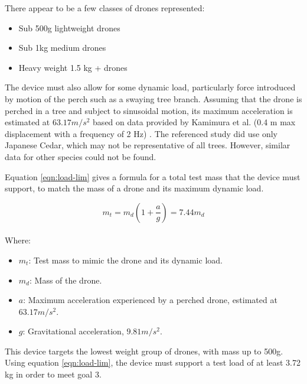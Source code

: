 \begin{minipage}{\linewidth}
There appear to be a few classes of drones represented:
\begin{itemize}
    \item Sub 500g lightweight drones
    \item Sub 1kg medium drones
    \item Heavy weight 1.5 kg + drones
\end{itemize}
\end{minipage}
\vspace{\baselineskip}


The device must also allow for some dynamic load, particularly force introduced by motion of the perch such as a swaying tree branch.
Assuming that the drone is perched in a tree and subject to sinusoidal motion, its maximum acceleration is estimated at $63.17 m/s^2$ 
based on data provided by Kamimura et al. (0.4 m max displacement with a frequency of 2 Hz) \cite{kamimura_energy_2024}.  
The referenced study did use only Japanese Cedar, which may not
be representative of all trees. However, similar data for other species could not be found.

Equation \ref{eqn:load-lim} gives a formula for a total test mass that the device must support, 
to match the mass of a drone and its maximum dynamic load.

\begin{minipage}{\linewidth}
    \begin{equation}
        m_t = m_d (1 + \frac{a}{g}) = 7.44 m_d
        \label{eqn:load-lim}
    \end{equation}\\
    Where:
    \begin{itemize}
        \item $m_t$: Test mass to mimic the drone and its dynamic load.
        \item $m_d$: Mass of the drone.
        \item $a$: Maximum acceleration experienced by a perched drone, estimated at $63.17 m/s^2$.
        \item $g$: Gravitational acceleration, $9.81 m/s^2$.
    \end{itemize}
\end{minipage}
\vspace{\baselineskip}

This device targets the lowest weight group of drones, with mass up to 500g. Using equation \ref{eqn:load-lim},
the device must support a test load of at least 3.72 kg in order to meet goal 3.

